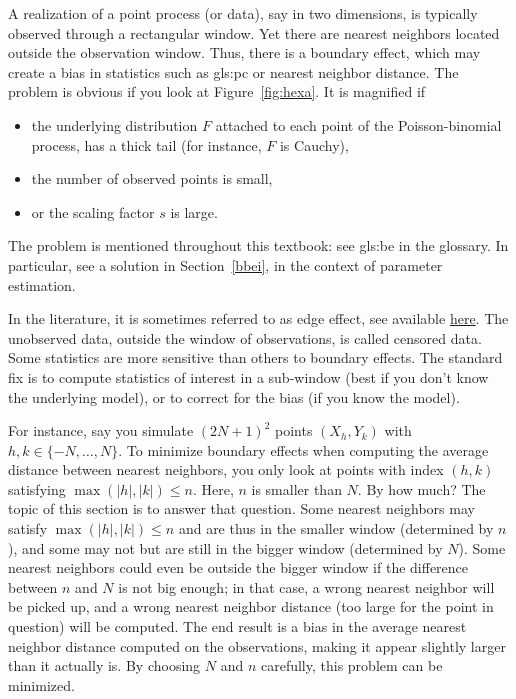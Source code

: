 \documentclass[10pt]{article}
\begin{document}
A realization of a point process (or data), say in two dimensions, is typically observed through a rectangular window. Yet there are nearest neighbors located outside the observation window. Thus, there is a boundary effect, which may create a \textcolor{index}{bias} in statistics such as
\gls{gls:pc} or \textcolor{index}{nearest neighbor distance}. The problem is obvious if you look at Figure~\ref{fig:hexa}. It is magnified if
\begin{itemize}
\item the underlying distribution $F$ attached to each point of the Poisson-binomial process, has a thick tail (for instance, $F$ is Cauchy),
\item the number of observed points is small,
\item or the \textcolor{index}{scaling factor} $s$ is large.
\end{itemize}
The problem is mentioned throughout this textbook: see \gls{gls:be} in the glossary.
In particular, see a solution in Section~\ref{bbei}, in the context of parameter estimation.

In the literature, it is sometimes referred to as
\textcolor{index}{edge effect}, see \cite{badxxx} available \href{https://projecteuclid.org/journals/annals-of-statistics/volume-25/issue-1/Kaplan-Meier-estimators-of-distance-distributions-for-spatial-point-processes/10.1214/aos/1034276629.full}{here}. The unobserved data, outside the window of observations, is called
\textcolor{index}{censored data}. Some statistics are more sensitive than others to boundary effects.  The standard fix is to compute statistics of interest in a sub-window (best if you don't know the underlying model), or to correct for the bias (if you know the model).

For instance, say you simulate $(2N+1)^2$ points $(X_h,Y_k)$ with $h,k\in\{-N,\dots,N\}$. To minimize boundary effects when computing the average distance between nearest neighbors, you only look at points with index $(h, k)$ satisfying $\max(|h|,|k|)\leq n$. Here, $n$ is smaller than $N$. By how much? The topic of this section is to answer that question. Some nearest neighbors may satisfy $\max(|h|,|k|)\leq n$ and are thus in the smaller window (determined by $n$), and some may not but are still in the bigger window (determined by $N$). Some nearest neighbors could even be outside the bigger window if the difference between $n$ and $N$ is not big enough; in that case, a wrong nearest neighbor will be picked up, and a wrong nearest neighbor distance (too large for the point in question) will be computed. The end result is a bias in the average nearest neighbor distance computed on the observations, making it appear slightly larger than it actually is. By choosing $N$ and $n$ carefully, this problem can be minimized.
\end{document}
